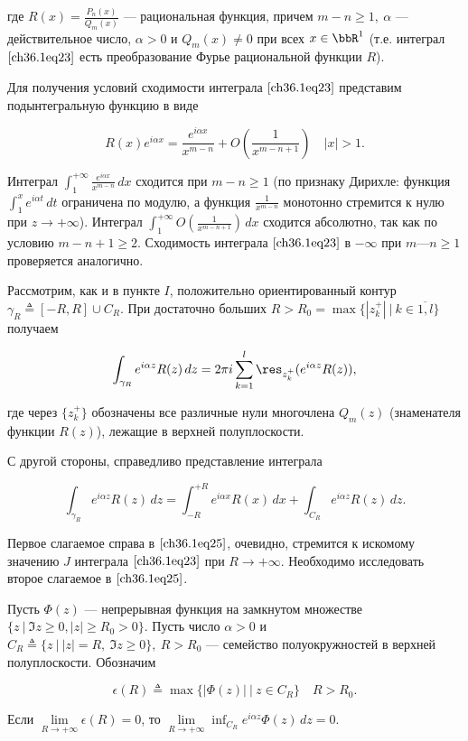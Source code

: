где $R(x) = \frac{P_n(x)}{Q_m(x)}$ --- рациональная функция, причем $m - n \ge 1, \: \alpha$ --- действительное число, $\alpha > 0$ и $Q_m(x) \not= 0$ при всех $x \in \bbR^1$ (т.е. интеграл $\eqref{ch36.1eq23}$ есть преобразование Фурье рациональной функции $R$).

Для получения условий сходимости интеграла $\eqref{ch36.1eq23}$ представим подынтегральную функцию в виде

$$
R(x) e^{i \alpha x} = \frac{e^{i \alpha x}}{x^{m - n}} + O \left( \frac{1}{x^{m - n + 1}} \right) \quad |x| > 1.
$$

Интеграл $\int_1^{+\infty} \frac{e^{i \alpha x}}{x^{m - n}} \,dx$ сходится при $m - n \ge 1$ (по признаку Дирихле: функция $\int_1^x e^{i\alpha t}\,dt$ ограничена по модулю, а функция $\frac{1}{x^{m - n}}$ монотонно стремится к нулю при $z \to +\infty$). Интеграл 
$\int_{1}^{+\infty} O \left( \frac{1}{x^{m - n + 1}} \right)\,dx$ сходится абсолютно, так как по условию $m - n + 1 \ge 2$. Сходимость интеграла $\eqref{ch36.1eq23}$ в $-\infty$ при $m — n \ge 1$ проверяется аналогично.

Рассмотрим, как и в пункте $I$, положительно ориентированный контур $\gamma_R \triangleq [-R,R] \cup C_R$. При достаточно больших $R > R_0 = \max \{ |z_k^+| \: \big| \: k \in \overline{1,l} \}$ получаем

\begin{equation} \label{ch36.1eq24}
\int_{\gamma_R} e^{i \alpha z}R(z) \,dz = 2\pi i \sum_{k = 1}^l \res_{z_k^+} (e^{i\alpha z}R(z)),
\end{equation}

где через $\{ z_k^+ \}$ обозначены все различные нули многочлена $Q_m(z)$ (знаменателя функции $R(z)$), лежащие в верхней полуплоскости.

С другой стороны, справедливо представление интеграла 

\begin{equation} \label{ch36.1eq25}
\int_{\gamma_R} e^{i \alpha z}R(z)\,dz = \int_{-R}^{+R} e^{i \alpha x}R(x)\,dx + \int_{C_R} e^{i \alpha z} R(z)\,dz.
\end{equation}

Первое слагаемое справа в $\eqref{ch36.1eq25}$, очевидно, стремится к искомому значению $J$ интеграла $\eqref{ch36.1eq23}$ при $R \to +\infty$. Необходимо исследовать второе слагаемое в $\eqref{ch36.1eq25}$.

\begin{lemm} [Жордана] \label{ch36.1emm5}
Пусть $\Phi(z)$ --- непрерывная функция на замкнутом множестве $\{ z \: \big| \: \Im z \ge 0, |z| \ge R_0 > 0 \}$. Пусть число $\alpha > 0$ и $C_R \triangleq \{ z \: \big| \: |z| = R, \: \Im z \ge 0 \}, \: R > R_0$ --- семейство полуокружностей в верхней полуплоскости. Обозначим

$$
\epsilon(R) \triangleq \max \{ |\Phi(z)| \: \big| \: z \in C_R \} \quad R > R_0.
$$

Если $\lim\limits_{R \to +\infty} \epsilon(R) = 0$, то $\lim\limits_{R \to +\infty} \inf_{C_R} e^{i \alpha z} \Phi(z) \,dz = 0$.

\end{lemm}

